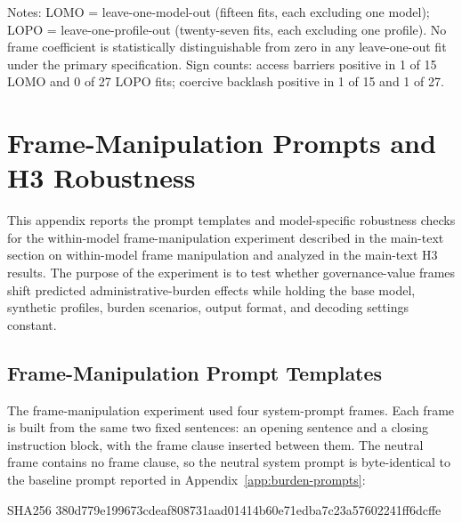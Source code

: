 \documentclass[11pt]{article}
\begin{document}
\begin{table}[htbp]
\centering
\caption{Leave-one-out ranges under the primary (pair-fixed-effects) specification}
\label{tab:h2_pairfe_leaveout}
\begin{flushleft}
\footnotesize Notes: LOMO = leave-one-model-out (fifteen fits, each excluding one model); LOPO = leave-one-profile-out (twenty-seven fits, each excluding one profile). No frame coefficient is statistically distinguishable from zero in any leave-one-out fit under the primary specification. Sign counts: access barriers positive in 1 of 15 LOMO and 0 of 27 LOPO fits; coercive backlash positive in 1 of 15 and 1 of 27.
\end{flushleft}
\end{table}

\clearpage   %
\section{Frame-Manipulation Prompts and H3 Robustness}
\label{app:h3-prompts-robustness}

This appendix reports the prompt templates and model-specific robustness checks for the within-model frame-manipulation experiment described in the main-text section on within-model frame manipulation and analyzed in the main-text H3 results. The purpose of the experiment is to test whether governance-value frames shift predicted administrative-burden effects while holding the base model, synthetic profiles, burden scenarios, output format, and decoding settings constant.

\subsection{Frame-Manipulation Prompt Templates}

The frame-manipulation experiment used four system-prompt frames. Each frame is built from the same two fixed sentences: an opening sentence and a closing instruction block, with the frame clause inserted between them. The neutral frame contains no frame clause, so the neutral system prompt is byte-identical to the baseline prompt reported in Appendix~\ref{app:burden-prompts}:
\begin{flushleft}
{\footnotesize\ttfamily SHA256 380d779e199673cdeaf808731aad01414b60e71edba7c23a57602241ff6dcffe}
\end{flushleft}
\end{document}
